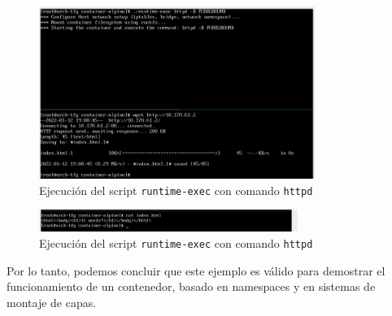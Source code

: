 \documentclass[a4paper, oneside, 12pt]{book}
\begin{document}
\begin{enumerate}
		\pagebreak
		
		\begin{figure}[h!]
			\begin{center}
				\includegraphics[width=0.8\textwidth]{img/container_runtime3.png}
				\caption{Ejecución del script \texttt{runtime-exec} con comando \texttt{httpd}}
			\end{center}
		\end{figure}
	
		\begin{figure}[h!]
			\begin{center}
				\includegraphics[width=0.75\textwidth]{img/container_runtime4.png}
				\caption{Ejecución del script \texttt{runtime-exec} con comando \texttt{httpd}}
			\end{center}
		\end{figure}
		
		\noindent Por lo tanto, podemos concluir que este ejemplo es válido para demostrar el funcionamiento de un contenedor, basado en namespaces y en sistemas de montaje de capas.
		
	\end{enumerate}
	
	\pagebreak
	
\end{document}
